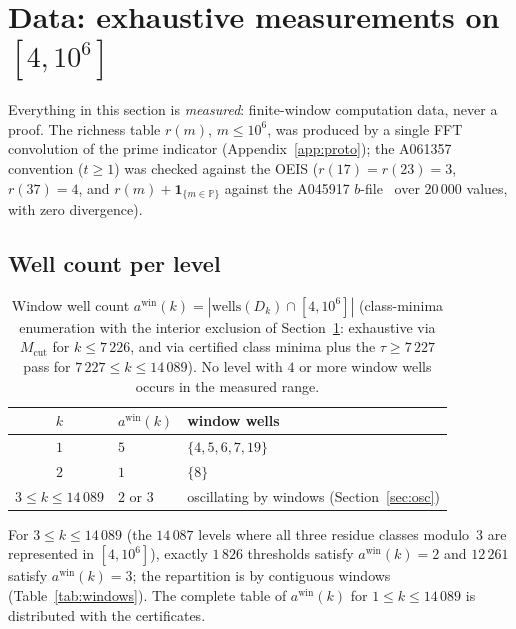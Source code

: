 \documentclass[11pt]{article}
\theoremstyle{plain}
\theoremstyle{definition}
\newcommand{\rch}{r}
\newcommand{\Dk}{D_{k}}
\newcommand{\Mcut}{M_{\mathrm{cut}}}
\newcommand{\wells}{\mathrm{wells}}
\begin{document}
\section{Data: exhaustive measurements on \texorpdfstring{$[4,10^{6}]$}{[4, 10\^{}6]}}
\label{sec:data}

Everything in this section is \emph{measured}: finite-window
computation data, never a proof. The richness table $\rch(m)$,
$m \le 10^{6}$, was produced by a single FFT convolution of the
prime indicator (Appendix~\ref{app:proto}); the A061357 convention
($t \ge 1$) was checked against the OEIS ($\rch(17) = \rch(23) = 3$,
$\rch(37) = 4$, and $\rch(m) + \mathbf{1}_{\{m \in \mathbb{P}\}}$
against the A045917 $b$-file~\cite{oeis} over $20\,000$ values, with
zero divergence).

\subsection{Well count per level}

\begin{table}[htbp]
\centering
\caption{Window well count $a^{\mathrm{win}}(k) =
|\wells(\Dk) \cap [4,10^{6}]|$ (class-minima enumeration with the
interior exclusion of Section~\ref{sec:data}: exhaustive via
$\Mcut$ for $k \le 7\,226$, and via certified class minima plus the
$\tau \ge 7\,227$ pass for $7\,227 \le k \le 14\,089$). No level
with $4$ or more window wells occurs in the measured range.}
\label{tab:wells}
\begin{tabular}{@{}cll@{}}
\toprule
$k$ & $a^{\mathrm{win}}(k)$ & window wells\\
\midrule
$1$ & $5$ & $\{4,5,6,7,19\}$\\
$2$ & $1$ & $\{8\}$\\
$3 \le k \le 14\,089$ & $2$ or $3$ & oscillating by windows
 (Section~\ref{sec:osc})\\
\bottomrule
\end{tabular}
\end{table}

For $3 \le k \le 14\,089$ (the $14\,087$ levels where all three
residue classes modulo~$3$ are represented in $[4,10^6]$), exactly
$1\,826$ thresholds satisfy $a^{\mathrm{win}}(k) = 2$ and $12\,261$
satisfy $a^{\mathrm{win}}(k) = 3$; the repartition is by contiguous
windows (Table~\ref{tab:windows}). The complete table of
$a^{\mathrm{win}}(k)$ for $1 \le k \le 14\,089$ is distributed with
the certificates.
\end{document}
